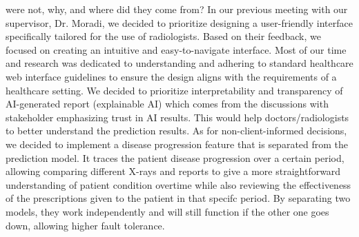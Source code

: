 \documentclass[12pt, titlepage]{article}
\begin{document}
\begin{enumerate}
  were not, why, and where did they come from?
  \newline\newline
  In our previous meeting with our supervisor, Dr. Moradi, we decided to prioritize designing a user-friendly interface specifically tailored for the use of radiologists. Based on their feedback, we focused on creating an intuitive and easy-to-navigate interface. Most of our time and research was dedicated to understanding and adhering to standard healthcare web interface guidelines to ensure the design aligns with the requirements of a healthcare setting. We decided to prioritize interpretability and transparency of AI-generated report (explainable AI) which comes from the discussions with stakeholder emphasizing trust in AI results. This would help doctors/radiologists to better understand the prediction results. As for non-client-informed decisions, we decided to implement a disease progression feature that is separated from the prediction model. It traces the patient disease progression over a certain period, allowing comparing different X-rays and reports to give a more straightforward understanding of patient condition overtime while also reviewing the effectiveness of the prescriptions given to the patient in that specifc period. By separating two models, they work independently and will still function if the other one goes down, allowing higher fault tolerance.


\end{enumerate}
\end{document}

